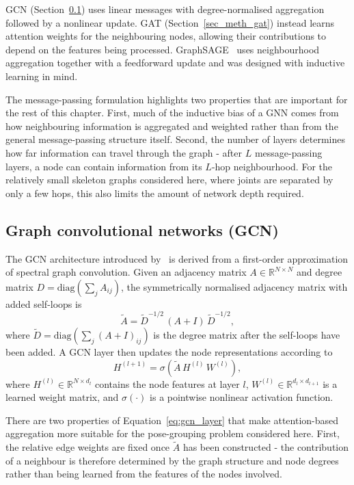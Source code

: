 GCN (Section~\ref{sec_meth_gcn}) uses linear messages with degree-normalised aggregation followed by a nonlinear update.
GAT (Section~\ref{sec_meth_gat}) instead learns attention weights for the neighbouring nodes,
allowing their contributions to depend on the features being processed.
GraphSAGE~\cite{hamilton2017graphsage} uses neighbourhood aggregation together with a feedforward update
and was designed with inductive learning in mind.

The message-passing formulation highlights two properties that are important for the rest of this chapter.
First, much of the inductive bias of a GNN
comes from how neighbouring information is aggregated and weighted
rather than from the general message-passing structure itself.
Second, the number of layers determines how far information can travel through the graph -
after $L$ message-passing layers, a node can contain information from its $L$-hop neighbourhood.
For the relatively small skeleton graphs considered here,
where joints are separated by only a few hops,
this also limits the amount of network depth required.

\subsection{Graph convolutional networks (GCN)}
\label{sec_meth_gcn}

The GCN architecture introduced by~\cite{kipf2017gcn}
is derived from a first-order approximation of spectral graph convolution.
Given an adjacency matrix $A \in \mathbb{R}^{N \times N}$
and degree matrix $D = \mathrm{diag}(\sum_j A_{ij})$,
the symmetrically normalised adjacency matrix with added self-loops is
\begin{equation}
    \tilde{A} = \tilde{D}^{-1/2}\,(A + I)\,\tilde{D}^{-1/2},
    \label{eq:gcn_adjacency}
\end{equation}
where $\tilde{D} = \mathrm{diag}(\sum_j (A+I)_{ij})$ is the degree matrix after the self-loops have been added.
A GCN layer then updates the node representations according to
\begin{equation}
    H^{(l+1)} =
    \sigma\!\left(\tilde{A}\,H^{(l)}\,W^{(l)}\right),
    \label{eq:gcn_layer}
\end{equation}
where $H^{(l)} \in \mathbb{R}^{N \times d_l}$ contains the node features at layer $l$,
$W^{(l)} \in \mathbb{R}^{d_l \times d_{l+1}}$ is a learned weight matrix,
and $\sigma(\cdot)$ is a pointwise nonlinear activation function.

There are two properties of Equation~\eqref{eq:gcn_layer}
that make attention-based aggregation more suitable for the pose-grouping problem considered here.
First, the relative edge weights are fixed once $\tilde{A}$ has been constructed -
the contribution of a neighbour is therefore determined by the graph structure and node degrees
rather than being learned from the features of the nodes involved.

